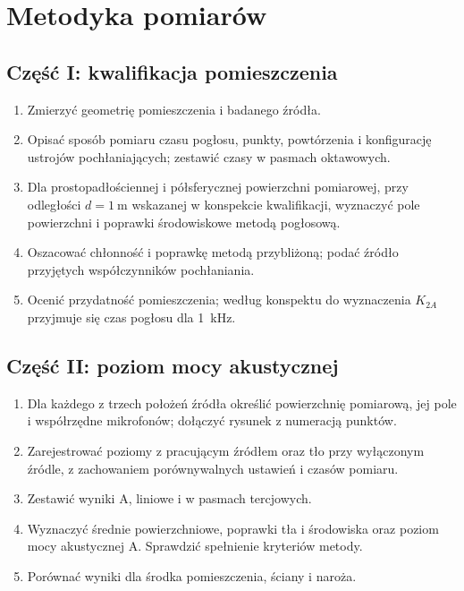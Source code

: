 \section{Metodyka pomiarów}
\label{sec:metodyka}
\subsection{Część I: kwalifikacja pomieszczenia}
\begin{enumerate}
\item Zmierzyć geometrię pomieszczenia i badanego źródła.
\item Opisać sposób pomiaru czasu pogłosu, punkty, powtórzenia i konfigurację
ustrojów pochłaniających; zestawić czasy w pasmach oktawowych.
\item Dla prostopadłościennej i półsferycznej powierzchni pomiarowej,
przy odległości $d=\qty{1}{\metre}$ wskazanej w konspekcie kwalifikacji,
wyznaczyć pole powierzchni i poprawki środowiskowe metodą pogłosową.
\item Oszacować chłonność i poprawkę metodą przybliżoną; podać źródło
przyjętych współczynników pochłaniania.
\item Ocenić przydatność pomieszczenia; według konspektu do wyznaczenia
$K_{2A}$ przyjmuje się czas pogłosu dla \qty{1}{\kilo\hertz}.
\end{enumerate}

\subsection{Część II: poziom mocy akustycznej}
\begin{enumerate}
\item Dla każdego z trzech położeń źródła określić powierzchnię pomiarową,
jej pole i współrzędne mikrofonów; dołączyć rysunek z numeracją punktów.
\item Zarejestrować poziomy z pracującym źródłem oraz tło przy wyłączonym
źródle, z zachowaniem porównywalnych ustawień i czasów pomiaru.
\item Zestawić wyniki A, liniowe i w pasmach tercjowych.
\item Wyznaczyć średnie powierzchniowe, poprawki tła i środowiska oraz
poziom mocy akustycznej A. Sprawdzić spełnienie kryteriów metody.
\item Porównać wyniki dla środka pomieszczenia, ściany i naroża.
\end{enumerate}
